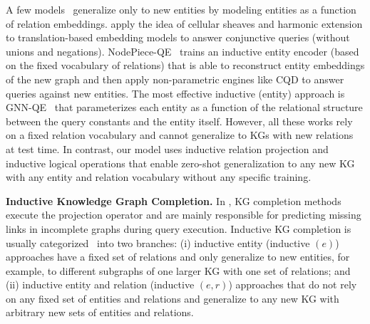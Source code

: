 A few models~\citep{gnn_qe,galkin2022, sheaves} generalize only to %
new entities by modeling entities as a function of relation embeddings.
\citet{sheaves} apply the idea of cellular sheaves and harmonic extension to translation-based embedding models to answer conjunctive queries (without unions and negations).
NodePiece-QE~\citep{galkin2022} trains an inductive entity encoder (based on the fixed vocabulary of relations) that is able to reconstruct entity embeddings of the %
new graph and then apply non-parametric engines like CQD to answer queries against %
new entities.
The most effective inductive (entity) approach is GNN-QE~\cite{gnn_qe, galkin2022} that parameterizes each entity as a function of the relational structure between the query constants and the entity itself.
However, all these works rely on a fixed relation vocabulary and cannot generalize to KGs with new relations at test time.
In contrast, our model uses inductive relation projection and inductive logical operations that enable zero-shot generalization to any new KG with any entity and relation vocabulary without any specific training.

\textbf{Inductive Knowledge Graph Completion.}
In \clqa, KG completion methods execute the projection operator and are mainly responsible for predicting missing links in incomplete graphs during query execution. 
Inductive KG completion is usually categorized~\citep{chen2023generalizing} into two branches: (i) inductive entity (inductive $(e)$) approaches have a fixed set of relations and only generalize to %
new entities, for example, to different subgraphs of one larger KG with one set of relations; and (ii) inductive entity and relation (inductive $(e,r)$) approaches that do not rely on any fixed set of entities and relations and generalize to any new KG with arbitrary new sets of entities and relations.

